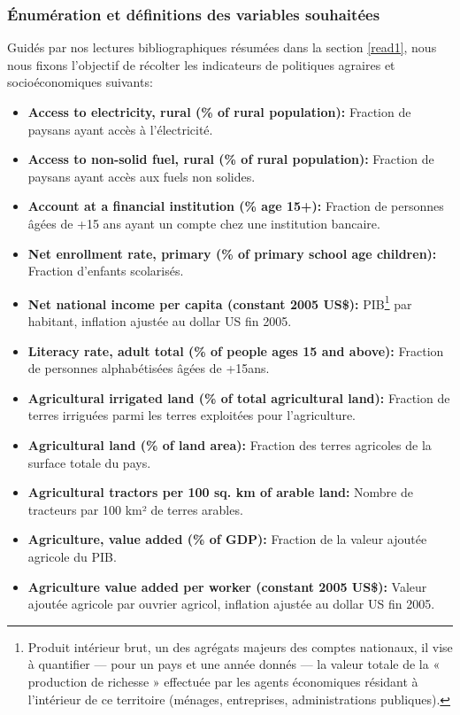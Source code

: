 	\subsubsection{Énumération et définitions des variables souhaitées }\label{exoList}
			Guidés par nos lectures bibliographiques résumées dans la section \ref{read1}, nous nous fixons l'objectif de récolter les indicateurs de politiques agraires et socioéconomiques suivants:
	\begin{itemize}
		\item \textbf{ Access to electricity, rural (\% of rural population):} Fraction de paysans ayant accès à l'électricité.
		\item \textbf{ Access to non-solid fuel, rural (\% of rural population):} Fraction de paysans ayant accès aux fuels non solides.
		\item \textbf{ Account at a financial institution (\% age 15+):} Fraction de personnes âgées de +15 ans ayant un compte chez une institution bancaire.
		\item \textbf{ Net enrollment rate, primary (\% of primary school age children):} Fraction d'enfants scolarisés.
		\item \textbf{ Net national income per capita (constant 2005 US\$):} PIB\footnote{Produit intérieur brut, un des agrégats majeurs des comptes nationaux, il vise à quantifier — pour un pays et une année donnés — la valeur totale de la « production de richesse » effectuée par les agents économiques résidant à l’intérieur de ce territoire (ménages, entreprises, administrations publiques).} par habitant, inflation ajustée au dollar US fin 2005.
		\item \textbf{ Literacy rate, adult total (\% of people ages 15 and above):} Fraction de personnes alphabétisées âgées de +15ans.
		\item \textbf{ Agricultural irrigated land (\% of total agricultural land):} Fraction de terres irriguées parmi les terres exploitées pour l'agriculture.
		\item \textbf{ Agricultural land (\% of land area):} Fraction des terres agricoles de la surface totale du pays.
		\item \textbf{ Agricultural tractors per 100 sq. km of arable land:} Nombre de tracteurs par 100 km² de terres arables.
		\item \textbf{ Agriculture, value added (\% of GDP):} Fraction de la valeur ajoutée agricole du PIB.
		\item \textbf{ Agriculture value added per worker (constant 2005 US\$):} Valeur ajoutée agricole par ouvrier agricol, inflation ajustée au dollar US fin 2005.

\end{itemize}
